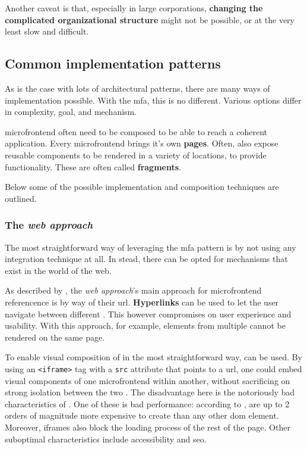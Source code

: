 Another caveat is that, especially in large corporations, \textbf{changing the
complicated organizational structure} might not be possible, or at the very
least slow and difficult.

\subsection{Common implementation patterns}
\label{ssec:mf-implementation-patterns}

As is the case with lots of architectural patterns, there are many ways of
implementation possible. With the \gls{mfa}, this is no different. Various
options differ in complexity, goal, and mechanism. 

\Gls{microfrontend} often need to be composed to be able to reach a coherent
application. Every microfrontend brings it's own \textbf{pages}. Often,
 also expose reusable components to be rendered in a
variety of locations, to provide functionality. These are often called
\textbf{fragments}.

Below some of the possible implementation and composition techniques are
outlined.

\subsubsection{The \textit{web approach}}

The most straightforward way of leveraging the \gls{mfa} pattern is by not using
any integration technique at all. In stead, there can be opted for mechanisms
that exist in the world of the web. 

As described by \textcite{Rappl_2021}, the \textit{web approach}'s main approach
for \gls{microfrontend} referencence is by way of their \gls{url}.
\textbf{Hyperlinks} can be used to let the user navigate between different
. This however compromises on user experience and
usability. With this approach, for example, elements from multiple
 cannot be rendered on the same page. 

To enable visual composition of  in the most
straightforward way, \textbf{} can be used. By using an
\texttt{<iframe>} tag with a \texttt{src} attribute that points to a \gls{url},
one could embed visual components of one \gls{microfrontend} within another,
without sacrificing on strong isolation between the two \autocite{Geers_2020}.
The disadvantage here is the notoriously bad characteristics of
. One of these is bad performance: according to
\textcite{Souders_2013},  are up to 2 orders of magnitude more
expensive to create than any other \gls{dom} element. Moreover, iframes also
block the loading process of the rest of the page. Other suboptimal
characteristics include accessibility and \gls{seo}.

